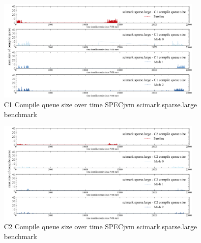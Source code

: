\begin{figure}[ht]
  \begin{center}
    \centering
    \includegraphics[width=0.9\textwidth]{figures/spec_queue_scirmarksparselarge_separate_c1.png}
    \caption{C1 Compile queue size over time SPECjvm scimark.sparse.large benchmark}
    \label{f:spec_queue_scirmarksparselarge_separate_c1}
  \end{center}
\end{figure}
\begin{figure}[ht]
  \begin{center}
    \centering
    \includegraphics[width=0.9\textwidth]{figures/spec_queue_scirmarksparselarge_separate_c2.png}
    \caption{C2 Compile queue size over time SPECjvm scimark.sparse.large benchmark}
    \label{f:spec_queue_scirmarksparselarge_separate_c2}
  \end{center}
\end{figure}
